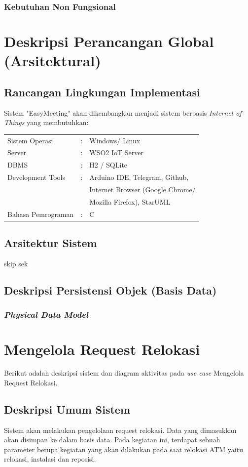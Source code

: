 \subsubsection{Kebutuhan Non Fungsional}
\section{Deskripsi Perancangan Global (Arsitektural)}
\subsection{Rancangan Lingkungan Implementasi}
\tab Sistem "EasyMeeting" akan dikembangkan menjadi sistem berbasis \textit{Internet of Things} yang membutuhkan:
	\begin{tabular}{lll}
		\tabitem Sistem Operasi	&: &Windows/ Linux \\
		\tabitem Server &: &WSO2 IoT Server \\
		\tabitem DBMS &: &H2 / SQLite \\
		\tabitem Development Tools &: &Arduino IDE, Telegram, Github, \\
		&&Internet Browser (Google Chrome/ \\ 
		&&Mozilla Firefox), StarUML \\
		\tabitem Bahasa Pemrograman &: &C  \\
	\end{tabular}

\subsection{Arsitektur Sistem}
\tab skip sek
\subsection{Deskripsi Persistensi Objek (Basis Data)}
\subsubsection{\textit{Physical Data Model}}
\tab 

\section{Mengelola Request Relokasi}
Berikut adalah deskripsi sistem dan diagram aktivitas pada \textit{use case} Mengelola Request Relokasi. 
\subsection{Deskripsi Umum Sistem}
\tab Sistem akan melakukan pengelolaan request relokasi. Data yang dimasukkan akan disimpan ke dalam basis data. Pada kegiatan ini, terdapat sebuah parameter berupa kegiatan yang akan dilakukan pada saat relokasi ATM yaitu relokasi, instalasi dan reposisi.
